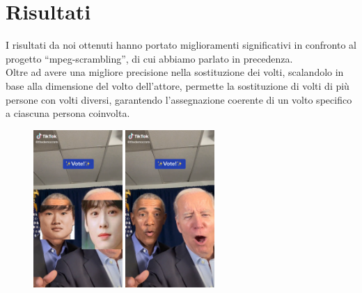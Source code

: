 \documentclass{report}
\begin{document}
\chapter{Risultati}
I risultati da noi ottenuti hanno portato miglioramenti significativi in confronto al progetto “mpeg-scrambling”, di cui abbiamo parlato in precedenza. \\
Oltre ad avere una migliore precisione nella sostituzione dei volti, scalandolo in base alla dimensione del volto dell’attore, permette la sostituzione di volti di più persone con volti diversi, garantendo l’assegnazione coerente di un volto specifico a ciascuna persona coinvolta. \\

\begin{samepage}
    \begin{figure}[!htb]
    \begin{minipage}{0.48\textwidth}
        \centering
        \includegraphics[height=6cm]{frame_obama_biden.png}
    \end{minipage}\hfill
    \begin{minipage}{0.48\textwidth}
        \centering
        \includegraphics[height=6cm]{frame_obama_biden_sub.png}
    \end{minipage}\hfill
    \end{figure}
\end{samepage}
\end{document}
